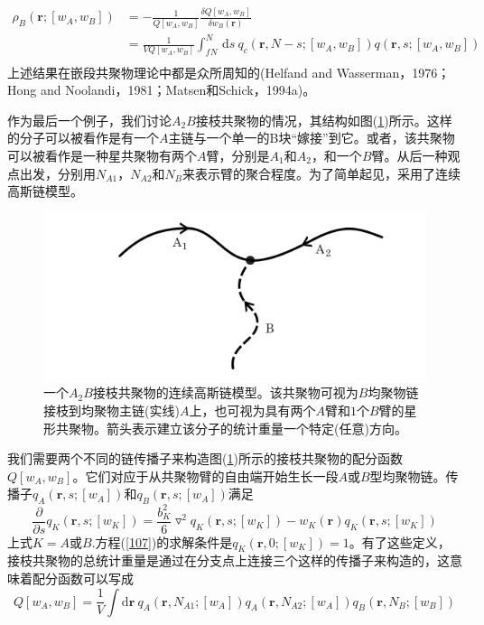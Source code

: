 \begin{equation}
\begin{aligned}
\rho _B(\mathbf{r};[w_A,w_B]) & =-\frac{1}{Q[w_A,w_B]}	\frac{\delta Q[w_A,w_B]}{\delta w_B(\mathbf{r})} \\
& =\frac{1}{VQ[w_A,w_B]} \int _{fN}^{N}\,\mathrm{d}s~q_c(\mathbf{r},N-s;[w_A,w_B])q(\mathbf{r},s;[w_A,w_B]) \\
\end{aligned}	
\end{equation}
上述结果在嵌段共聚物理论中都是众所周知的(Helfand and Wasserman，1976；Hong and Noolandi，1981；Matsen和Schick，1994a)。

作为最后一个例子，我们讨论$A_2B$接枝共聚物的情况，其结构如图(\ref{3.8})所示。这样的分子可以被看作是有一个$A$主链与一个单一的B块“嫁接”到它。或者，该共聚物可以被看作是一种星共聚物有两个$A$臂，分别是$A_1$和$A_2$，和一个$B$臂。从后一种观点出发，分别用$N_{A1}$，$N_{A2}$和$N_B$来表示臂的聚合程度。为了简单起见，采用了连续高斯链模型。

\begin{figure}[H]
\centering
\includegraphics[scale=0.7]{./figures/38.png}
\caption{一个$A_2B$接枝共聚物的连续高斯链模型。该共聚物可视为$B$均聚物链接枝到均聚物主链(实线)$A$上，也可视为具有两个$A$臂和$1$个$B$臂的星形共聚物。箭头表示建立该分子的统计重量一个特定(任意)方向。}
\label{3.8}
\end{figure}		

我们需要两个不同的链传播子来构造图(\ref{3.8})所示的接枝共聚物的配分函数$Q[w_A,w_B]$。它们对应于从共聚物臂的自由端开始生长一段$A$或$B$型均聚物链。传播子$q_A(\mathbf{r},s;[w_A])$和$q_B(\mathbf{r},s;[w_A])$满足
\begin{equation}
\frac{\partial}{\partial s}q_K(\mathbf{r},s;[w_K])=\frac{b_K^2}{6}\triangledown ^2q_K(\mathbf{r},s;[w_K])-w_K(\mathbf{r})q_K(\mathbf{r},s;[w_K]) \label{107}
\end{equation}
上式$K=A$或$B$.方程(\ref{107})的求解条件是$q_K(\mathbf{r},0;[w_K])=1$。有了这些定义，接枝共聚物的总统计重量是通过在分支点上连接三个这样的传播子来构造的，这意味着配分函数可以写成
\begin{equation}
Q[w_A,w_B]=\frac{1}{V}\int \mathrm{d}\mathbf{r}~q_A(\mathbf{r},N_{A1};[w_A])q_A(\mathbf{r},N_{A2};[w_A])q_B(\mathbf{r},N_B;[w_B])
\end{equation}

